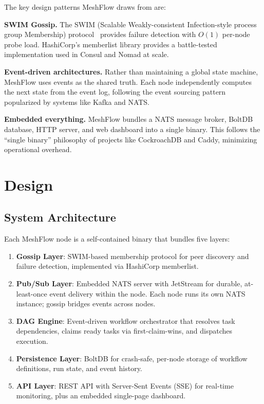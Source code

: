 \documentclass[sigconf]{acmart}
\begin{document}
The key design patterns MeshFlow draws from are:

\textbf{SWIM Gossip.} The SWIM (Scalable Weakly-consistent Infection-style process group Membership) protocol~\cite{swim} provides failure detection with $O(1)$ per-node probe load. HashiCorp's memberlist library provides a battle-tested implementation used in Consul and Nomad at scale.

\textbf{Event-driven architectures.} Rather than maintaining a global state machine, MeshFlow uses events as the shared truth. Each node independently computes the next state from the event log, following the event sourcing pattern popularized by systems like Kafka and NATS.

\textbf{Embedded everything.} MeshFlow bundles a NATS message broker, BoltDB database, HTTP server, and web dashboard into a single binary. This follows the ``single binary'' philosophy of projects like CockroachDB and Caddy, minimizing operational overhead.

\section{Design}

\subsection{System Architecture}

Each MeshFlow node is a self-contained binary that bundles five layers:

\begin{enumerate}
\item \textbf{Gossip Layer}: SWIM-based membership protocol for peer discovery and failure detection, implemented via HashiCorp memberlist.
\item \textbf{Pub/Sub Layer}: Embedded NATS server with JetStream for durable, at-least-once event delivery within the node. Each node runs its own NATS instance; gossip bridges events across nodes.
\item \textbf{DAG Engine}: Event-driven workflow orchestrator that resolves task dependencies, claims ready tasks via first-claim-wins, and dispatches execution.
\item \textbf{Persistence Layer}: BoltDB for crash-safe, per-node storage of workflow definitions, run state, and event history.
\item \textbf{API Layer}: REST API with Server-Sent Events (SSE) for real-time monitoring, plus an embedded single-page dashboard.
\end{enumerate}
\end{document}
